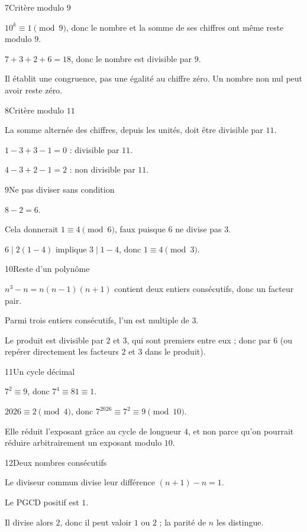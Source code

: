 \begin{corrige}{7}{Critère modulo $9$}
\begin{questions}
\item $10^k\equiv1\pmod9$, donc le nombre et la somme de ses chiffres ont même reste modulo $9$.
\item $7+3+2+6=18$, donc le nombre est divisible par $9$.
\item Il établit une congruence, pas une égalité au chiffre zéro. Un nombre non nul peut avoir reste zéro.
\end{questions}
\end{corrige}
\begin{corrige}{8}{Critère modulo $11$}
\begin{questions}
\item La somme alternée des chiffres, depuis les unités, doit être divisible par $11$.
\item $1-3+3-1=0$ : divisible par $11$.
\item $4-3+2-1=2$ : non divisible par $11$.
\end{questions}
\end{corrige}
\begin{corrige}{9}{Ne pas diviser sans condition}
\begin{questions}
\item $8-2=6$.
\item Cela donnerait $1\equiv4\pmod6$, faux puisque $6$ ne divise pas $3$.
\item $6\mid2(1-4)$ implique $3\mid1-4$, donc $1\equiv4\pmod3$.
\end{questions}
\end{corrige}
\begin{corrige}{10}{Reste d’un polynôme}
\begin{questions}
\item $n^3-n=n(n-1)(n+1)$ contient deux entiers consécutifs, donc un facteur pair.
\item Parmi trois entiers consécutifs, l’un est multiple de $3$.
\item Le produit est divisible par $2$ et $3$, qui sont premiers entre eux ; donc par $6$ (ou repérer directement les facteurs $2$ et $3$ dans le produit).
\end{questions}
\end{corrige}
\begin{corrige}{11}{Un cycle décimal}
\begin{questions}
\item $7^2\equiv9$, donc $7^4\equiv81\equiv1$.
\item $2026\equiv2\pmod4$, donc $7^{2026}\equiv7^2\equiv9\pmod{10}$.
\item Elle réduit l’exposant grâce au cycle de longueur $4$, et non parce qu’on pourrait réduire arbitrairement un exposant modulo $10$.
\end{questions}
\end{corrige}
\begin{corrige}{12}{Deux nombres consécutifs}
\begin{questions}
\item Le diviseur commun divise leur différence $(n+1)-n=1$.
\item Le PGCD positif est $1$.
\item Il divise alors $2$, donc il peut valoir $1$ ou $2$ ; la parité de $n$ les distingue.
\end{questions}
\end{corrige}

